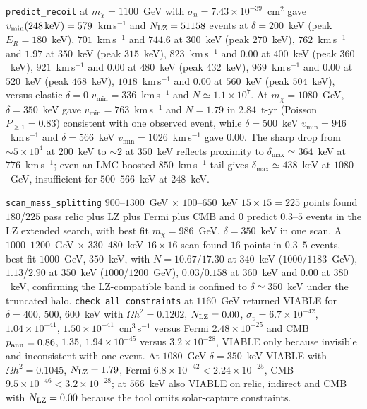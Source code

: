 \documentclass[11pt,a4paper]{article}
\begin{document}
\texttt{predict\_recoil} at $m_{\chi}=1100$~GeV with $\sigma_{n}=7.43\times10^{-39}$~cm$^{2}$ gave $v_{\min}(248\,{\rm keV})=579$~km\,s$^{-1}$ and $N_{\rm LZ}=51158$ events at $\delta=200$~keV (peak $E_{R}=180$~keV), $701$~km\,s$^{-1}$ and $744.6$ at $300$~keV (peak $270$~keV), $762$~km\,s$^{-1}$ and $1.97$ at $350$~keV (peak $315$~keV), $823$~km\,s$^{-1}$ and $0.00$ at $400$~keV (peak $360$~keV), $921$~km\,s$^{-1}$ and $0.00$ at $480$~keV (peak $432$~keV), $969$~km\,s$^{-1}$ and $0.00$ at $520$~keV (peak $468$~keV), $1018$~km\,s$^{-1}$ and $0.00$ at $560$~keV (peak $504$~keV), versus elastic $\delta=0$ $v_{\min}=336$~km\,s$^{-1}$ and $N\simeq1.1\times10^{7}$. At $m_{\chi}=1080$~GeV, $\delta=350$~keV gave $v_{\min}=763$~km\,s$^{-1}$ and $N=1.79$ in $2.84$~t-yr (Poisson $P_{\ge1}=0.83$) consistent with one observed event, while $\delta=500$~keV $v_{\min}=946$~km\,s$^{-1}$ and $\delta=566$~keV $v_{\min}=1026$~km\,s$^{-1}$ gave $0.00$. The sharp drop from $\sim5\times10^{4}$ at $200$~keV to $\sim2$ at $350$~keV reflects proximity to $\delta_{\max}\simeq364$~keV at $776$~km\,s$^{-1}$; even an LMC-boosted $850$~km\,s$^{-1}$ tail gives $\delta_{\max}\simeq438$~keV at $1080$~GeV, insufficient for $500$--$566$~keV at $248$~keV.

\texttt{scan\_mass\_splitting} $900$--$1300$~GeV $\times$ $100$--$650$~keV $15\times15=225$ points found $180$/$225$ pass relic plus LZ plus Fermi plus CMB and $0$ predict $0.3$--$5$ events in the LZ extended search, with best fit $m_{\chi}=986$~GeV, $\delta=350$~keV in one scan. A $1000$--$1200$~GeV $\times$ $330$--$480$~keV $16\times16$ scan found $16$ points in $0.3$--$5$ events, best fit $1000$~GeV, $350$~keV, with $N=10.67$/$17.30$ at $340$~keV ($1000$/$1183$~GeV), $1.13$/$2.90$ at $350$~keV ($1000$/$1200$~GeV), $0.03$/$0.158$ at $360$~keV and $0.00$ at $380$~keV, confirming the LZ-compatible band is confined to $\delta\simeq350$~keV under the truncated halo. \texttt{check\_all\_constraints} at $1160$~GeV returned VIABLE for $\delta=400$, $500$, $600$~keV with $\Omega h^{2}=0.1202$, $N_{\rm LZ}=0.00$, $\sigma_{v}=6.7\times10^{-42}$, $1.04\times10^{-41}$, $1.50\times10^{-41}$~cm$^{3}$\,s$^{-1}$ versus Fermi $2.48\times10^{-25}$ and CMB $p_{\rm ann}=0.86$, $1.35$, $1.94\times10^{-45}$ versus $3.2\times10^{-28}$, VIABLE only because invisible and inconsistent with one event. At $1080$~GeV $\delta=350$~keV VIABLE with $\Omega h^{2}=0.1045$, $N_{\rm LZ}=1.79$, Fermi $6.8\times10^{-42}<2.24\times10^{-25}$, CMB $9.5\times10^{-46}<3.2\times10^{-28}$; at $566$~keV also VIABLE on relic, indirect and CMB with $N_{\rm LZ}=0.00$ because the tool omits solar-capture constraints.
\end{document}
